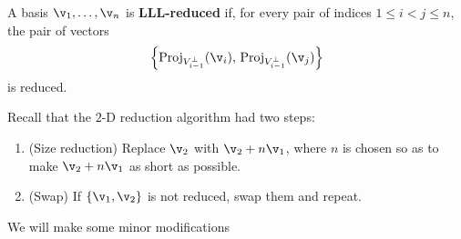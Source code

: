A basis $\v_1,\ldots,\v_n$ is \textbf{LLL-reduced} if, for every pair of indices $1\leq i<j\leq n$, the pair of vectors 
\[\left\{\text{Proj}_{V_{i-1}^\perp}(\v_i),\,\text{Proj}_{V_{i-1}^\perp}(\v_j)\right\}\]
is reduced. 

Recall that the $2$-D reduction algorithm had two steps:

\begin{enumerate}
	\item (Size reduction) Replace $\v_2$ with $\v_2+n\v_1$, where $n$ is chosen so as to make $\v_2+n\v_1$ as short as possible.
	\item (Swap) If $\{\v_1,\v_2\}$ is not reduced, swap them and repeat.
\end{enumerate}

We will make some minor modifications


\begin{comment}

Given a basis $\v_1,\ldots,\v_n$, the \textbf{Gram-Schmidt basis}, $\widetilde{\v_1},\ldots,\widetilde{\v_n}$ is defined recursively by getting rid of the projections onto all previous vectors:
\[\widetilde{\v_1}=v_1,\qquad \widetilde{\v_{i+1}}=\v_{i+1}-\text{Proj}_{\{\widetilde{\v_1},\ldots,\widetilde{\v_i}\}}(\v_{i+1}).\]
Note that the Gram-Schmidt basis will \emph{not} typically generate the same lattice.

\begin{explor}
	Compute the Gram-Schmidt basis for our running example $\{\u,\v,\w\}$.
\end{explor}

\begin{explor}
	Suppose that $\x=a_1\v_1+\cdots a_n\v_n$ is a nonzero lattice vector. Suppose $a_j\neq 0$, but $a_k=0$ for all $k>j$. Prove that $\|\x\|\geq |a_j|\|\widetilde{\v_j}\|$. Use this to find a lower bound for the length of a shortest vector: $\lambda_1\geq \min_i\|\widetilde{\v_i}\|$.
\end{explor}

\begin{explor}
	The determinant of a matrix does not change if multiples of one column are added to another column. Use this to prove that the basis matrix for $\{\v_1,\ldots,\v_n\}$ and for $\{\widetilde{\v_1},\ldots,\widetilde{\v_n}\}$ have the same determinant. Conclude that the volume of the fundamental parallelepiped of $\LL$ equals the product $\|\widetilde{\v_1}\|\cdots\|\widetilde{\v_n}\|$.
\end{explor}

The previous two explorations, together with Corollary~\ref{cor:lengthbound} from yesterday, prove that
\[\min_i\|\widetilde{\v_i}\|\leq \lambda_1\leq \sqrt{n}\prod_{i=1}^n\|\widetilde{\v_1}\|.\]

\end{comment}
 